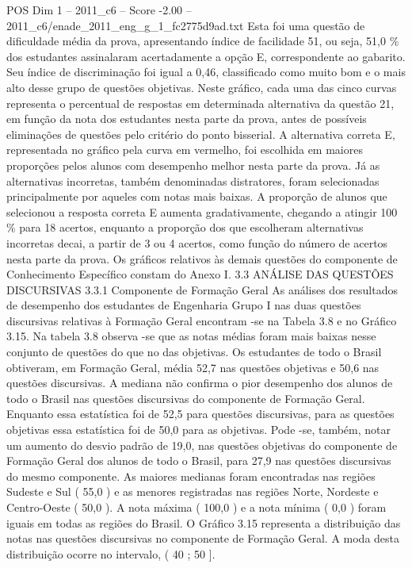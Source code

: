 \begin{textsample}{POS Dim 1 – 2011\_c6 – Score -2.00 – 2011\_c6/enade\_2011\_eng\_g\_1\_fc2775d9ad.txt}
Esta foi uma questão de dificuldade média da prova, apresentando índice de facilidade 51, ou seja, 51,0 \% dos estudantes assinalaram acertadamente a opção E, correspondente ao gabarito.
Seu índice de discriminação foi igual a 0,46, classificado como muito bom e o mais alto desse grupo de questões objetivas.
Neste gráfico, cada uma das cinco curvas representa o percentual de respostas em determinada alternativa da questão 21, em função da nota dos estudantes nesta parte da prova, antes de possíveis eliminações de questões pelo critério do ponto bisserial.
A alternativa correta E, representada no gráfico pela curva em vermelho, foi escolhida em maiores proporções pelos alunos com desempenho melhor nesta parte da prova.
Já as alternativas incorretas, também denominadas distratores, foram selecionadas principalmente por aqueles com notas mais baixas.
A proporção de alunos que selecionou a resposta correta E aumenta gradativamente, chegando a atingir 100 \% para 18 acertos, enquanto a proporção dos que escolheram alternativas incorretas decai, a partir de 3 ou 4 acertos, como função do número de acertos nesta parte da prova.
Os gráficos relativos às demais questões do componente de Conhecimento Específico constam do Anexo I. 3.3 ANÁLISE DAS QUESTÕES DISCURSIVAS 3.3.1 Componente de Formação Geral As análises dos resultados de desempenho dos estudantes de Engenharia Grupo I nas duas questões discursivas relativas à Formação Geral encontram -se na Tabela 3.8 e no Gráfico 3.15.
Na tabela 3.8 observa -se que as notas médias foram mais baixas nesse conjunto de questões do que no das objetivas.
Os estudantes de todo o Brasil obtiveram, em Formação Geral, média 52,7 nas questões objetivas e 50,6 nas questões discursivas.
A mediana não confirma o pior desempenho dos alunos de todo o Brasil nas questões discursivas do componente de Formação Geral.
Enquanto essa estatística foi de 52,5 para questões discursivas, para as questões objetivas essa estatística foi de 50,0 para as objetivas.
Pode -se, também, notar um aumento do desvio padrão de 19,0, nas questões objetivas do componente de Formação Geral dos alunos de todo o Brasil, para 27,9 nas questões discursivas do mesmo componente.
As maiores medianas foram encontradas nas regiões Sudeste e Sul ( 55,0 ) e as menores registradas nas regiões Norte, Nordeste e Centro-Oeste ( 50,0 ).
A nota máxima ( 100,0 ) e a nota mínima ( 0,0 ) foram iguais em todas as regiões do Brasil.
O Gráfico 3.15 representa a distribuição das notas nas questões discursivas no componente de Formação Geral.
A moda desta distribuição ocorre no intervalo, ( 40 ; 50 ].

\end{textsample}
